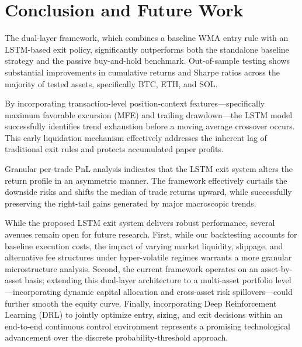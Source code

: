 \documentclass[12pt]{article}
\begin{document}
\section{Conclusion and Future Work}\label{sec:conclusion}

The dual-layer framework, which combines a baseline WMA entry rule with an LSTM-based exit policy, significantly outperforms both the standalone baseline strategy and the passive buy-and-hold benchmark. Out-of-sample testing shows substantial improvements in cumulative returns and Sharpe ratios across the majority of tested assets, specifically BTC, ETH, and SOL.

By incorporating transaction-level position-context features—specifically maximum favorable excursion (MFE) and trailing drawdown—the LSTM model successfully identifies trend exhaustion before a moving average crossover occurs. This early liquidation mechanism effectively addresses the inherent lag of traditional exit rules and protects accumulated paper profits.

Granular per-trade PnL analysis indicates that the LSTM exit system alters the return profile in an asymmetric manner. The framework effectively curtails the downside risks and shifts the median of trade returns upward, while successfully preserving the right-tail gains generated by major macroscopic trends.

While the proposed LSTM exit system delivers robust performance, several avenues remain open for future research. First, while our backtesting accounts for baseline execution costs, the impact of varying market liquidity, slippage, and alternative fee structures under hyper-volatile regimes warrants a more granular microstructure analysis. Second, the current framework operates on an asset-by-asset basis; extending this dual-layer architecture to a multi-asset portfolio level—incorporating dynamic capital allocation and cross-asset risk spillovers—could further smooth the equity curve. Finally, incorporating Deep Reinforcement Learning (DRL) to jointly optimize entry, sizing, and exit decisions within an end-to-end continuous control environment represents a promising technological advancement over the discrete probability-threshold approach.








\newpage



\end{document}
